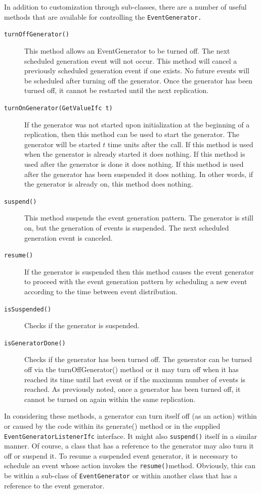 \documentclass[
]{book}
\theoremstyle{definition}
\theoremstyle{definition}
\theoremstyle{definition}
\theoremstyle{definition}
\theoremstyle{remark}
\begin{document}
In addition to customization through sub-classes, there are a number of
useful methods that are available for controlling the \texttt{EventGenerator.}

\begin{description}
\item[\texttt{turnOffGenerator()}]
This method allows an EventGenerator to be turned off. The next
scheduled generation event will not occur. This method will cancel a
previously scheduled generation event if one exists. No future
events will be scheduled after turning off the generator. Once the
generator has been turned off, it cannot be restarted until the next
replication.
\item[\texttt{turnOnGenerator(GetValueIfc\ t)}]
If the generator was not started upon initialization at the
beginning of a replication, then this method can be used to start
the generator. The generator will be started \(t\) time units after
the call. If this method is used when the generator is already
started it does nothing. If this method is used after the generator
is done it does nothing. If this method is used after the generator
has been suspended it does nothing. In other words, if the generator
is already on, this method does nothing.
\item[\texttt{suspend()}]
This method suspends the event generation pattern. The generator is
still on, but the generation of events is suspended. The next
scheduled generation event is canceled.
\item[\texttt{resume()}]
If the generator is suspended then this method causes the event
generator to proceed with the event generation pattern by scheduling
a new event according to the time between event distribution.
\item[\texttt{isSuspended()}]
Checks if the generator is suspended.
\item[\texttt{isGeneratorDone()}]
Checks if the generator has been turned off. The generator can be
turned off via the turnOffGenerator() method or it may turn off when
it has reached its time until last event or if the maximum number of
events is reached. As previously noted, once a generator has been
turned off, it cannot be turned on again within the same
replication.
\end{description}

In considering these methods, a generator can turn itself off (as an
action) within or caused by the code within its generate() method or in
the supplied \texttt{EventGeneratorListenerIfc} interface. It might also
\texttt{suspend()} itself in a similar manner. Of course, a class that has a
reference to the generator may also turn it off or suspend it. To resume
a suspended event generator, it is necessary to schedule an event whose
action invokes the \texttt{resume()}method. Obviously, this can be within a
sub-class of \texttt{EventGenerator} or within another class that has a reference
to the event generator.
\end{document}
